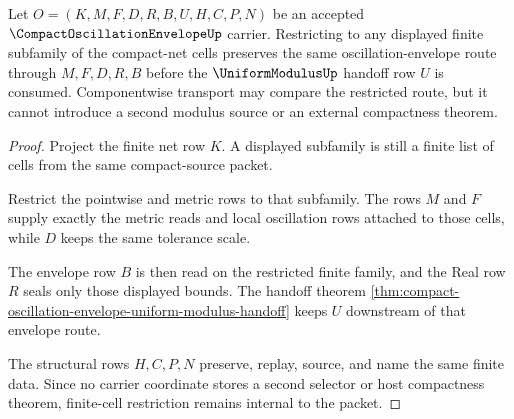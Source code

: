 \begin{theorem}
\label{thm:compact-oscillation-envelope-finite-cell-stability}
Let $O=(K,M,F,D,R,B,U,H,C,P,N)$ be an accepted $\CompactOscillationEnvelopeUp$ carrier. Restricting to any displayed finite subfamily of the compact-net cells preserves the same oscillation-envelope route through $M,F,D,R,B$ before the $\UniformModulusUp$ handoff row $U$ is consumed. Componentwise transport may compare the restricted route, but it cannot introduce a second modulus source or an external compactness theorem.
\end{theorem}
\begin{proof}
Project the finite net row $K$. A displayed subfamily is still a finite list of cells from the same compact-source packet.

Restrict the pointwise and metric rows to that subfamily. The rows $M$ and $F$ supply exactly the metric reads and local oscillation rows attached to those cells, while $D$ keeps the same tolerance scale.

The envelope row $B$ is then read on the restricted finite family, and the Real row $R$ seals only those displayed bounds. The handoff theorem \autoref{thm:compact-oscillation-envelope-uniform-modulus-handoff} keeps $U$ downstream of that envelope route.

The structural rows $H,C,P,N$ preserve, replay, source, and name the same finite data. Since no carrier coordinate stores a second selector or host compactness theorem, finite-cell restriction remains internal to the packet.
\end{proof}




